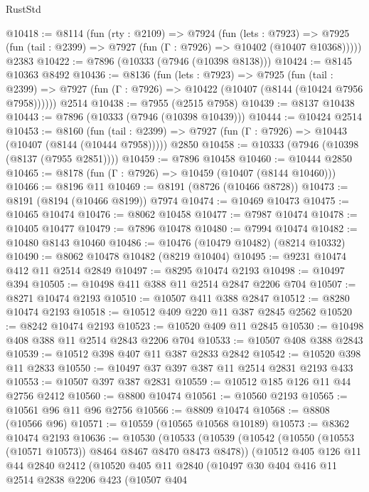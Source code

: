 \begin{lexlean}{RustStd}
\begin{coremodule}
{\begin{coremodule}
{{{{{{{{{{{{{{{{{{{{{{{{{{{{{{{{{{{{{{{{{{{{{{{{{{@10418 := @8114
    (fun (rty : @2109) =>
    @7924
      (fun (lets : @7923) =>
      @7925 (fun (tail : @2399) => @7927 (fun (Γ : @7926) => @10402 (@10407 @10368)))))
    @2383
@10422 := @7896 (@10333 (@7946 (@10398 @8138)))
@10424 := @8145 @10363 @8492
@10436 := @8136
    (fun (lets : @7923) =>
    @7925
      (fun (tail : @2399) =>
      @7927 (fun (Γ : @7926) => @10422 (@10407 (@8144 (@10424 @7956 @7958))))))
    @2514
@10438 := @7955 (@2515 @7958)
@10439 := @8137 @10438
@10443 := @7896 (@10333 (@7946 (@10398 @10439)))
@10444 := @10424 @2514
@10453 := @8160
    (fun (tail : @2399) => @7927 (fun (Γ : @7926) => @10443 (@10407 (@8144 (@10444 @7958)))))
    @2850
@10458 := @10333 (@7946 (@10398 (@8137 (@7955 @2851))))
@10459 := @7896 @10458
@10460 := @10444 @2850
@10465 := @8178 (fun (Γ : @7926) => @10459 (@10407 (@8144 @10460)))
@10466 := @8196 @11
@10469 := @8191 (@8726 (@10466 @8728))
@10473 := @8191 (@8194 (@10466 @8199)) @7974
@10474 := @10469 @10473
@10475 := @10465 @10474
@10476 := @8062 @10458
@10477 := @7987 @10474
@10478 := @10405 @10477
@10479 := @7896 @10478
@10480 := @7994 @10474
@10482 := @10480 @8143 @10460
@10486 := @10476 (@10479 @10482) (@8214 @10332)
@10490 := @8062 @10478 @10482 (@8219 @10404)
@10495 := @9231 @10474 @412 @11 @2514 @2849
@10497 := @8295 @10474 @2193
@10498 := @10497 @394
@10505 := @10498 @411 @388 @11 @2514 @2847 @2206 @704
@10507 := @8271 @10474 @2193
@10510 := @10507 @411 @388 @2847
@10512 := @8280 @10474 @2193
@10518 := @10512 @409 @220 @11 @387 @2845 @2562
@10520 := @8242 @10474 @2193
@10523 := @10520 @409 @11 @2845
@10530 := @10498 @408 @388 @11 @2514 @2843 @2206 @704
@10533 := @10507 @408 @388 @2843
@10539 := @10512 @398 @407 @11 @387 @2833 @2842
@10542 := @10520 @398 @11 @2833
@10550 := @10497 @37 @397 @387 @11 @2514 @2831 @2193 @433
@10553 := @10507 @397 @387 @2831
@10559 := @10512 @185 @126 @11 @44 @2756 @2412
@10560 := @8800 @10474
@10561 := @10560 @2193
@10565 := @10561 @96 @11 @96 @2756
@10566 := @8809 @10474
@10568 := @8808 (@10566 @96)
@10571 := @10559 (@10565 @10568 @10189)
@10573 := @8362 @10474 @2193
@10636 := @10530
    (@10533
      (@10539
        (@10542 (@10550 (@10553 (@10571 @10573)) @8464 @8467 @8470 @8473 @8478))
        (@10512
          @405
          @126
          @11
          @44
          @2840
          @2412
          (@10520
            @405
            @11
            @2840
            (@10497
              @30
              @404
              @416
              @11
              @2514
              @2838
              @2206
              @423
              (@10507
                @404
}}}}}}}}}}}}}}}}}}}}}}}}}}}}}}}}}}}}}}}}}}}}}}}}}}
\end{coremodule}}
\end{coremodule}
\end{lexlean}
